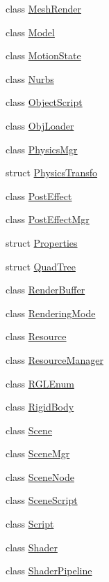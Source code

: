 \begin{DoxyCompactItemize}
class \hyperlink{class_agmd_1_1_mesh_render}{Mesh\+Render}
\item 
class \hyperlink{class_agmd_1_1_model}{Model}
\item 
class \hyperlink{class_agmd_1_1_motion_state}{Motion\+State}
\item 
class \hyperlink{class_agmd_1_1_nurbs}{Nurbs}
\item 
class \hyperlink{class_agmd_1_1_object_script}{Object\+Script}
\item 
class \hyperlink{class_agmd_1_1_obj_loader}{Obj\+Loader}
\item 
class \hyperlink{class_agmd_1_1_physics_mgr}{Physics\+Mgr}
\item 
struct \hyperlink{struct_agmd_1_1_physics_transfo}{Physics\+Transfo}
\item 
class \hyperlink{class_agmd_1_1_post_effect}{Post\+Effect}
\item 
class \hyperlink{class_agmd_1_1_post_effect_mgr}{Post\+Effect\+Mgr}
\item 
struct \hyperlink{struct_agmd_1_1_properties}{Properties}
\item 
struct \hyperlink{struct_agmd_1_1_quad_tree}{Quad\+Tree}
\item 
class \hyperlink{class_agmd_1_1_render_buffer}{Render\+Buffer}
\item 
class \hyperlink{class_agmd_1_1_rendering_mode}{Rendering\+Mode}
\item 
class \hyperlink{class_agmd_1_1_resource}{Resource}
\item 
class \hyperlink{class_agmd_1_1_resource_manager}{Resource\+Manager}
\item 
class \hyperlink{class_agmd_1_1_r_g_l_enum}{R\+G\+L\+Enum}
\item 
class \hyperlink{class_agmd_1_1_rigid_body}{Rigid\+Body}
\item 
class \hyperlink{class_agmd_1_1_scene}{Scene}
\item 
class \hyperlink{class_agmd_1_1_scene_mgr}{Scene\+Mgr}
\item 
class \hyperlink{class_agmd_1_1_scene_node}{Scene\+Node}
\item 
class \hyperlink{class_agmd_1_1_scene_script}{Scene\+Script}
\item 
class \hyperlink{class_agmd_1_1_script}{Script}
\item 
class \hyperlink{class_agmd_1_1_shader}{Shader}
\item 
class \hyperlink{class_agmd_1_1_shader_pipeline}{Shader\+Pipeline}
\item 

\end{DoxyCompactItemize}
